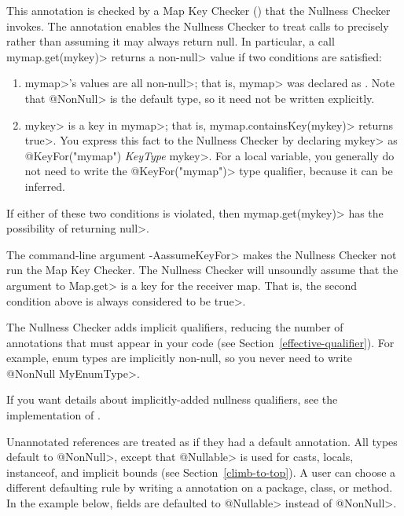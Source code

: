 This annotation is checked by a Map Key Checker
() that the Nullness Checker
invokes.  The  annotation enables
the Nullness Checker to treat calls to
precisely rather than assuming it may always return null.  In particular,
a call \<mymap.get(mykey)> returns a non-\<null> value if two conditions
are satisfied:
\begin{enumerate}
\item \<mymap>'s values are all non-\<null>; that is, \<mymap> was
  declared as .  Note
  that \<@NonNull> is the default type, so it need not be written explicitly.
\item \<mykey> is a key in \<mymap>; that is, \<mymap.containsKey(mykey)>
  returns \<true>.  You express this fact to the Nullness Checker by
  declaring \<mykey> as \<@KeyFor("mymap") \emph{KeyType} mykey>.  For a
  local variable, you generally do not need to write the
  \<@KeyFor("mymap")> type qualifier, because it can be inferred.
\end{enumerate}
\noindent
If either of these two conditions is violated, then \<mymap.get(mykey)> has
the possibility of returning \<null>.

The command-line argument \<-AassumeKeyFor> makes the Nullness Checker not
run the Map Key Checker.  The Nullness Checker will unsoundly assume that
the argument to \<Map.get> is a key for the receiver map.  That is, the
second condition above is always considered to be \<true>.




The Nullness Checker
adds implicit qualifiers, reducing the number of annotations that must
appear in your code (see Section~\ref{effective-qualifier}).
For example, enum types are implicitly non-null, so you never need to write
\<@NonNull MyEnumType>.

If you want details about implicitly-added nullness qualifiers, see the
implementation of .




Unannotated references are treated as if they had a default annotation.
All types default to
\<@NonNull>, except that \<@Nullable> is used for casts, locals,
instanceof, and implicit bounds (see Section~\ref{climb-to-top}).
A user can choose a different defaulting
rule by writing a  annotation on a
 package, class, or method.  In the example below, fields are defaulted to
\<@Nullable> instead of \<@NonNull>.

